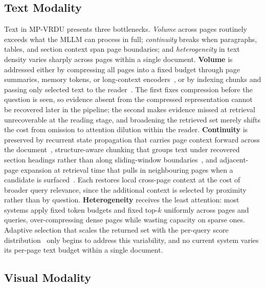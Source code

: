 \documentclass[11pt]{article}
\begin{document}
\subsection{Text Modality}
\label{sec:modality-text}

Text in MP-VRDU presents three bottlenecks. \emph{Volume} across pages routinely exceeds what the MLLM can process in full; \emph{continuity} breaks when paragraphs, tables, and section context span page boundaries; and \emph{heterogeneity} in text density varies sharply across pages within a single document. \textbf{Volume} is addressed either by compressing all pages into a fixed budget through page summaries, memory tokens, or long-context encoders~\cite{borchmann2025arctictilt,dong2024multipage,hu2025mplugdocowl2}, or by indexing chunks and passing only selected text to the reader~\cite{xie2024wukong,zhang2024cream,cho2024m3docrag}. The first fixes compression before the question is seen, so evidence absent from the compressed representation cannot be recovered later in the pipeline; the second makes evidence missed at retrieval unrecoverable at the reading stage, and broadening the retrieved set merely shifts the cost from omission to attention dilution within the reader. \textbf{Continuity} is preserved by recurrent state propagation that carries page context forward across the document~\cite{dong2024multipage}, structure-aware chunking that groups text under recovered section headings rather than along sliding-window boundaries~\cite{shin2025multidocfusion}, and adjacent-page expansion at retrieval time that pulls in neighbouring pages when a candidate is surfaced~\cite{qian2026accurate}. Each restores local cross-page context at the cost of broader query relevance, since the additional context is selected by proximity rather than by question. \textbf{Heterogeneity} receives the least attention: most systems apply fixed token budgets and fixed top-$k$ uniformly across pages and queries, over-compressing dense pages while wasting capacity on sparse ones. Adaptive selection that scales the returned set with the per-query score distribution~\cite{li2025avir} only begins to address this variability, and no current system varies its per-page text budget within a single document.

\subsection{Visual Modality}
\label{sec:modality-visual}
\end{document}
